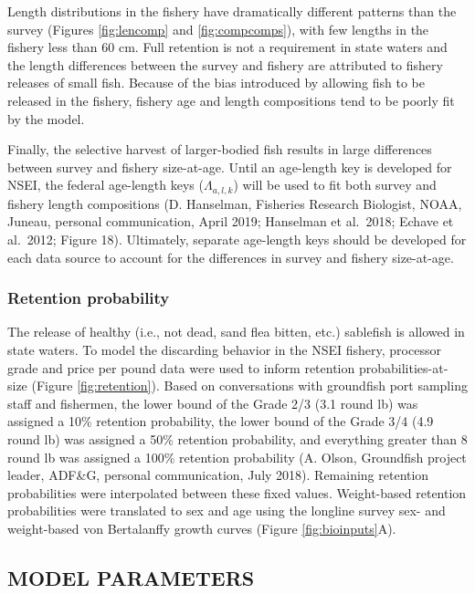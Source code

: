 \documentclass[
]{article}
\begin{document}
Length distributions in the fishery have dramatically different patterns than the survey (Figures \ref{fig:lencomp} and \ref{fig:compcomps}), with few lengths in the fishery less than 60 cm. Full retention is not a requirement in state waters and the length differences between the survey and fishery are attributed to fishery releases of small fish. Because of the bias introduced by allowing fish to be released in the fishery, fishery age and length compositions tend to be poorly fit by the model.

Finally, the selective harvest of larger-bodied fish results in large differences between survey and fishery size-at-age. Until an age-length key is developed for NSEI, the federal age-length keys (\(\Lambda_{a,l,k}\)) will be used to fit both survey and fishery length compositions (D. Hanselman, Fisheries Research Biologist, NOAA, Juneau, personal communication, April 2019; Hanselman et al.~2018; Echave et al.~2012; Figure 18). Ultimately, separate age-length keys should be developed for each data source to account for the differences in survey and fishery size-at-age.

\hypertarget{retention-probability}{%
\subsubsection{Retention probability}\label{retention-probability}}

The release of healthy (i.e., not dead, sand flea bitten, etc.) sablefish is allowed in state waters. To model the discarding behavior in the NSEI fishery, processor grade and price per pound data were used to inform retention probabilities-at-size (Figure \ref{fig:retention}). Based on conversations with groundfish port sampling staff and fishermen, the lower bound of the Grade 2/3 (3.1 round lb) was assigned a 10\% retention probability, the lower bound of the Grade 3/4 (4.9 round lb) was assigned a 50\% retention probability, and everything greater than 8 round lb was assigned a 100\% retention probability (A. Olson, Groundfish project leader, ADF\&G, personal communication, July 2018). Remaining retention probabilities were interpolated between these fixed values. Weight-based retention probabilities were translated to sex and age using the longline survey sex- and weight-based von Bertalanffy growth curves (Figure \ref{fig:bioinputs}A).

\hypertarget{model-parameters}{%
\subsection{MODEL PARAMETERS}\label{model-parameters}}
\end{document}
